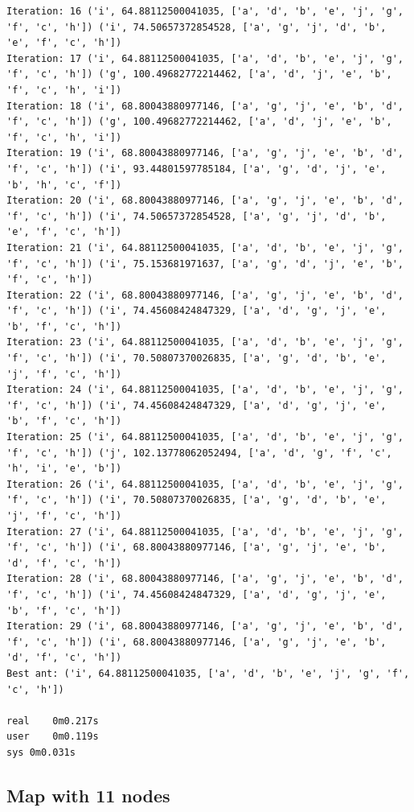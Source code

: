 \documentclass[11pt]{article}
\begin{document}
\begin{lstlisting}
Iteration: 16 ('i', 64.88112500041035, ['a', 'd', 'b', 'e', 'j', 'g', 'f', 'c', 'h']) ('i', 74.50657372854528, ['a', 'g', 'j', 'd', 'b', 'e', 'f', 'c', 'h'])
Iteration: 17 ('i', 64.88112500041035, ['a', 'd', 'b', 'e', 'j', 'g', 'f', 'c', 'h']) ('g', 100.49682772214462, ['a', 'd', 'j', 'e', 'b', 'f', 'c', 'h', 'i'])
Iteration: 18 ('i', 68.80043880977146, ['a', 'g', 'j', 'e', 'b', 'd', 'f', 'c', 'h']) ('g', 100.49682772214462, ['a', 'd', 'j', 'e', 'b', 'f', 'c', 'h', 'i'])
Iteration: 19 ('i', 68.80043880977146, ['a', 'g', 'j', 'e', 'b', 'd', 'f', 'c', 'h']) ('i', 93.44801597785184, ['a', 'g', 'd', 'j', 'e', 'b', 'h', 'c', 'f'])
Iteration: 20 ('i', 68.80043880977146, ['a', 'g', 'j', 'e', 'b', 'd', 'f', 'c', 'h']) ('i', 74.50657372854528, ['a', 'g', 'j', 'd', 'b', 'e', 'f', 'c', 'h'])
Iteration: 21 ('i', 64.88112500041035, ['a', 'd', 'b', 'e', 'j', 'g', 'f', 'c', 'h']) ('i', 75.153681971637, ['a', 'g', 'd', 'j', 'e', 'b', 'f', 'c', 'h'])
Iteration: 22 ('i', 68.80043880977146, ['a', 'g', 'j', 'e', 'b', 'd', 'f', 'c', 'h']) ('i', 74.45608424847329, ['a', 'd', 'g', 'j', 'e', 'b', 'f', 'c', 'h'])
Iteration: 23 ('i', 64.88112500041035, ['a', 'd', 'b', 'e', 'j', 'g', 'f', 'c', 'h']) ('i', 70.50807370026835, ['a', 'g', 'd', 'b', 'e', 'j', 'f', 'c', 'h'])
Iteration: 24 ('i', 64.88112500041035, ['a', 'd', 'b', 'e', 'j', 'g', 'f', 'c', 'h']) ('i', 74.45608424847329, ['a', 'd', 'g', 'j', 'e', 'b', 'f', 'c', 'h'])
Iteration: 25 ('i', 64.88112500041035, ['a', 'd', 'b', 'e', 'j', 'g', 'f', 'c', 'h']) ('j', 102.13778062052494, ['a', 'd', 'g', 'f', 'c', 'h', 'i', 'e', 'b'])
Iteration: 26 ('i', 64.88112500041035, ['a', 'd', 'b', 'e', 'j', 'g', 'f', 'c', 'h']) ('i', 70.50807370026835, ['a', 'g', 'd', 'b', 'e', 'j', 'f', 'c', 'h'])
Iteration: 27 ('i', 64.88112500041035, ['a', 'd', 'b', 'e', 'j', 'g', 'f', 'c', 'h']) ('i', 68.80043880977146, ['a', 'g', 'j', 'e', 'b', 'd', 'f', 'c', 'h'])
Iteration: 28 ('i', 68.80043880977146, ['a', 'g', 'j', 'e', 'b', 'd', 'f', 'c', 'h']) ('i', 74.45608424847329, ['a', 'd', 'g', 'j', 'e', 'b', 'f', 'c', 'h'])
Iteration: 29 ('i', 68.80043880977146, ['a', 'g', 'j', 'e', 'b', 'd', 'f', 'c', 'h']) ('i', 68.80043880977146, ['a', 'g', 'j', 'e', 'b', 'd', 'f', 'c', 'h'])
Best ant: ('i', 64.88112500041035, ['a', 'd', 'b', 'e', 'j', 'g', 'f', 'c', 'h'])

real	0m0.217s
user	0m0.119s
sys	0m0.031s
\end{lstlisting}


\subsection{Map with 11 nodes}
\end{document}
